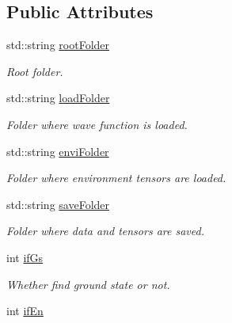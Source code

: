 \subsection*{Public Attributes}
\begin{DoxyCompactItemize}
\item 
std\+::string \hyperlink{structparaPess_a48d47eb7923074634ff3733cbb800380}{root\+Folder}\hypertarget{structparaPess_a48d47eb7923074634ff3733cbb800380}{}\label{structparaPess_a48d47eb7923074634ff3733cbb800380}

\begin{DoxyCompactList}\small\item\em Root folder. \end{DoxyCompactList}\item 
std\+::string \hyperlink{structparaPess_a283485961707c20d8422ef821a758545}{load\+Folder}\hypertarget{structparaPess_a283485961707c20d8422ef821a758545}{}\label{structparaPess_a283485961707c20d8422ef821a758545}

\begin{DoxyCompactList}\small\item\em Folder where wave function is loaded. \end{DoxyCompactList}\item 
std\+::string \hyperlink{structparaPess_a7df3649e1d898438ca8185b630b87c5e}{envi\+Folder}\hypertarget{structparaPess_a7df3649e1d898438ca8185b630b87c5e}{}\label{structparaPess_a7df3649e1d898438ca8185b630b87c5e}

\begin{DoxyCompactList}\small\item\em Folder where environment tensors are loaded. \end{DoxyCompactList}\item 
std\+::string \hyperlink{structparaPess_a1b88531c5cdfebf56e9c9caef458e03e}{save\+Folder}\hypertarget{structparaPess_a1b88531c5cdfebf56e9c9caef458e03e}{}\label{structparaPess_a1b88531c5cdfebf56e9c9caef458e03e}

\begin{DoxyCompactList}\small\item\em Folder where data and tensors are saved. \end{DoxyCompactList}\item 
int \hyperlink{structparaPess_a83bfff81364b40b0906bc54a6f1b916d}{if\+Gs}\hypertarget{structparaPess_a83bfff81364b40b0906bc54a6f1b916d}{}\label{structparaPess_a83bfff81364b40b0906bc54a6f1b916d}

\begin{DoxyCompactList}\small\item\em Whether find ground state or not. \end{DoxyCompactList}\item 
int \hyperlink{structparaPess_a26fc9b8d9b715f0b7c2890c6cc311523}{if\+En}\hypertarget{structparaPess_a26fc9b8d9b715f0b7c2890c6cc311523}{}\label{structparaPess_a26fc9b8d9b715f0b7c2890c6cc311523}


\end{DoxyCompactItemize}
